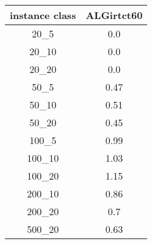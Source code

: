 \begin{tabular}{c|c|}
instance class & ALGirtct60 \\ 
\hline
20_5         & 0.0          \\ 
20_10        & 0.0          \\ 
20_20        & 0.0          \\ 
50_5         & 0.47         \\ 
50_10        & 0.51         \\ 
50_20        & 0.45         \\ 
100_5        & 0.99         \\ 
100_10       & 1.03         \\ 
100_20       & 1.15         \\ 
200_10       & 0.86         \\ 
200_20       & 0.7          \\ 
500_20       & 0.63         \\ 
\end{tabular}